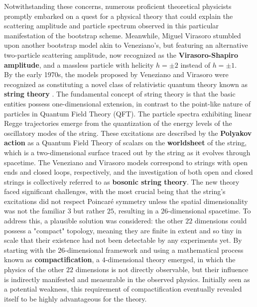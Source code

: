 \documentclass[12pt]{article}
\begin{document}
Notwithstanding these concerns, numerous proficient theoretical physicists promptly embarked on a quest for a physical theory that could explain the scattering amplitude and particle spectrum observed in this particular manifestation of the bootstrap scheme. Meanwhile, Miguel Virasoro stumbled upon another bootstrap model akin to Veneziano's, but featuring an alternative two-particle scattering amplitude, now recognized as the \textbf{Virasoro-Shapiro amplitude}, and a massless particle with helicity $h = \pm 2$ instead of $h = \pm 1$.\\
By the early 1970s, the models proposed by Veneziano and Virasoro were recognized as constituting a novel class of relativistic quantum theory known as \textbf{string theory} \cite{Veneziano1968, Virasoro1970}. The fundamental concept of string theory is that the basic entities possess one-dimensional extension, in contrast to the point-like nature of particles in Quantum Field Theory (QFT). The particle spectra exhibiting linear Regge trajectories emerge from the quantization of the energy levels of the oscillatory modes of the string. These excitations are described by the \textbf{Polyakov action} as a Quantum Field Theory of scalars on the \textbf{worldsheet} of the string, which is a two-dimensional surface traced out by the string as it evolves through spacetime. The Veneziano and Virasoro models correspond to strings with open ends and closed loops, respectively, and the investigation of both open and closed strings is collectively referred to as \textbf{bosonic string theory}.
\newline
The new theory faced significant challenges, with the most crucial being that the string's excitations did not respect Poincaré symmetry unless the spatial dimensionality was not the familiar $3$ but rather $25$, resulting in a $26$-dimensional spacetime. To address this, a plausible solution was considered: the other $22$ dimensions could possess a "compact" topology, meaning they are finite in extent and so tiny in scale that their existence had not been detectable by any experiments yet. By starting with the $26$-dimensional framework and using a mathematical process known as \textbf{compactification}, a $4$-dimensional theory emerged, in which the physics of the other $22$ dimensions is not directly observable, but their influence is indirectly manifested and measurable in the observed physics. Initially seen as a potential weakness, this requirement of compactification eventually revealed itself to be highly advantageous for the theory.\\
\end{document}
